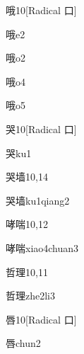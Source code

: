 \begin{entry}{哦}{10}[Radical ⼝]
  \begin{phonetics}{哦}{e2}
  \end{phonetics}
  \begin{phonetics}{哦}{o2}
  \end{phonetics}
  \begin{phonetics}{哦}{o4}
  \end{phonetics}
  \begin{phonetics}{哦}{o5}
  \end{phonetics}
\end{entry}

\begin{entry}{哭}{10}[Radical 口]
  \begin{phonetics}{哭}{ku1}
  \end{phonetics}
\end{entry}

\begin{entry}{哭墙}{10,14}
  \begin{phonetics}{哭墙}{ku1qiang2}
  \end{phonetics}
\end{entry}

\begin{entry}{哮喘}{10,12}
  \begin{phonetics}{哮喘}{xiao4chuan3}
  \end{phonetics}
\end{entry}

\begin{entry}{哲理}{10,11}
  \begin{phonetics}{哲理}{zhe2li3}
  \end{phonetics}
\end{entry}

\begin{entry}{唇}{10}[Radical ⼝]
  \begin{phonetics}{唇}{chun2}
  \end{phonetics}
\end{entry}


